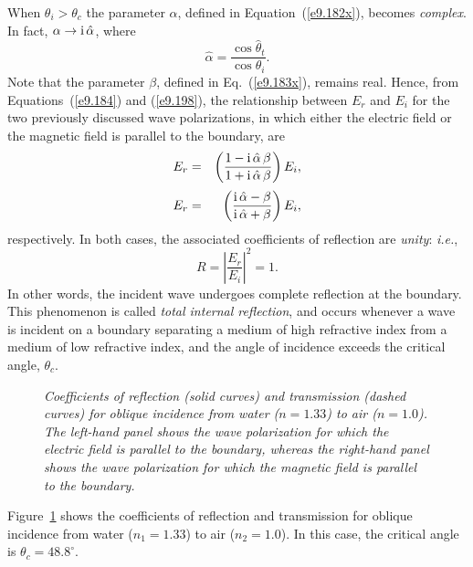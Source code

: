 When $\theta_i>\theta_c$ the parameter $\alpha$, defined in Equation~(\ref{e9.182x}), becomes {\em complex}. In fact, $\alpha\rightarrow {\rm i}\,\hat{\alpha}$, where
\begin{equation}
\hat{\alpha} = \frac{\cos\hat{\theta}_t}{\cos\theta_i}.
\end{equation}
Note that the parameter $\beta$, defined in Eq.~(\ref{e9.183x}), remains
real. Hence, from Equations~(\ref{e9.184}) and (\ref{e9.198}), the
relationship between $E_r$ and $E_i$ for the two previously discussed wave polarizations, in which
either the electric field or the magnetic field
is parallel to the boundary, are
\begin{eqnarray}
E_r &=& \left(\frac{1-{\rm i}\,\hat{\alpha}\,\beta}{1+{\rm i}\,\hat{\alpha}\,\beta}\right)E_i,\\[0.5ex]
E_r &=& \left(\frac{{\rm i}\,\hat{\alpha}-\beta}{{\rm i}\,\hat{\alpha}+\beta}\right)E_i,
\end{eqnarray}
respectively. In both cases, the associated coefficients of reflection are 
{\em unity}: {\em i.e.}, 
\begin{equation}
R = \left|\frac{E_r}{E_i}\right|^2 = 1.
\end{equation}
In other words, the incident wave undergoes  complete reflection at the boundary.
This phenomenon is called {\em total internal reflection}, and occurs
whenever a wave is incident on a boundary separating a medium of high
refractive index from  a medium of low refractive index, and the angle of
incidence exceeds the critical angle, $\theta_c$. 

\begin{figure}
\epsfysize=2.25in
\centerline{}
\caption{\em Coefficients of reflection (solid curves) and transmission (dashed curves) for oblique incidence from water ($n=1.33$) to
air ($n=1.0$). The left-hand panel shows the wave polarization
for which the electric field is parallel to the boundary, whereas the
right-hand panel shows the wave polarization for which the
magnetic field is parallel to the boundary.}\label{ffresnel1}
\end{figure}

Figure~\ref{ffresnel1} shows the coefficients of reflection and transmission
for oblique incidence from water  ($n_1=1.33$) to
air ($n_2=1.0$). In this case, the critical angle is $\theta_c= 48.8^\circ$. 

